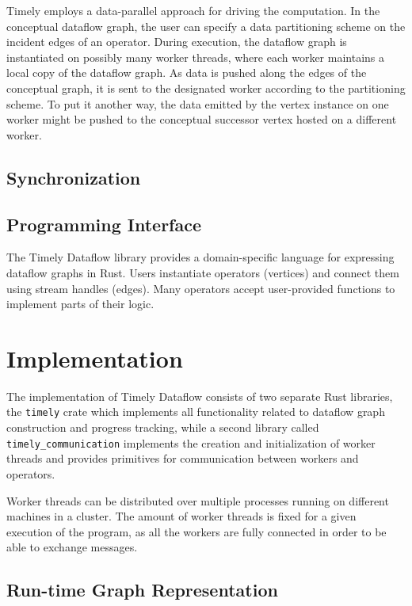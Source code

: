 \begin{addedbar}
Timely employs a data-parallel approach for driving the computation. In the
conceptual dataflow graph, the user can specify a data partitioning scheme
on the incident edges of an operator. During execution, the dataflow graph
is instantiated on possibly many worker threads, where each worker maintains
a local copy of the dataflow graph. As data is pushed along the edges of the
conceptual graph, it is sent to the designated worker according to the
partitioning scheme. To put it another way, the data emitted by the vertex
instance on one worker might be pushed to the conceptual successor vertex
hosted on a different worker.

\subsection{Synchronization}





\subsection{Programming Interface}

The Timely Dataflow library provides a domain-specific language for expressing
dataflow graphs in Rust. Users instantiate operators (vertices) and connect
them using stream handles (edges). Many operators accept user-provided functions
to implement parts of their logic.

\section{Implementation}

The implementation of Timely Dataflow consists of two separate Rust libraries,
the \lstinline{timely} crate which implements all functionality related to
dataflow graph construction and progress tracking, while a second library
called \lstinline{timely_communication} implements the creation and
initialization of worker threads and provides primitives for communication
between workers and operators. 

Worker threads can be distributed over multiple processes running on different
machines in a cluster. 
The amount of worker threads is fixed for a given execution of the program, as
all the workers are fully connected in order to be able to exchange messages.

\subsection{Run-time Graph Representation}


\end{addedbar}
